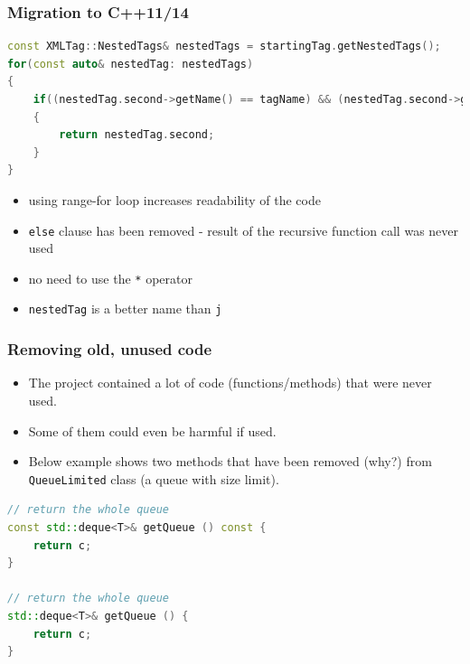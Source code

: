 \documentclass[10pt]{beamer}
\begin{document}
\begin{frame}[fragile]
\frametitle{Migration to C++11/14}
\begin{lstlisting}[language=c++, caption={Example of new C++ code (after refactoring).}]
const XMLTag::NestedTags& nestedTags = startingTag.getNestedTags();
for(const auto& nestedTag: nestedTags)
{
    if((nestedTag.second->getName() == tagName) && (nestedTag.second->getAttributeValue("id") == idValue))
    {
        return nestedTag.second;
    }
}
\end{lstlisting}
\begin{itemize}
    \item using range-for loop increases readability of the code
    \item \lstinline[basicstyle=\ttfamily\normalsize]{else} clause has been removed - result of the recursive function call was never used
    \item no need to use the \lstinline[basicstyle=\ttfamily\normalsize]{*} operator
    \item \lstinline[basicstyle=\ttfamily\normalsize]{nestedTag} is a better name than \lstinline[basicstyle=\ttfamily\normalsize]{j}
\end{itemize}
\end{frame}


\begin{frame}[fragile]
\frametitle{Removing old, unused code}
\begin{itemize}
\item The project contained a lot of code (functions/methods) that were never used.
\item Some of them could even be harmful if used.
\item Below example shows two methods that have been removed (why?) from \lstinline[basicstyle=\ttfamily\normalsize]{QueueLimited} class (a queue with size limit).
\end{itemize}
\begin{lstlisting}[language=c++, caption={Example of removed code.}]
// return the whole queue
const std::deque<T>& getQueue () const {
    return c;
}

// return the whole queue
std::deque<T>& getQueue () {
    return c;
}
\end{lstlisting}
\end{frame}
\end{document}
